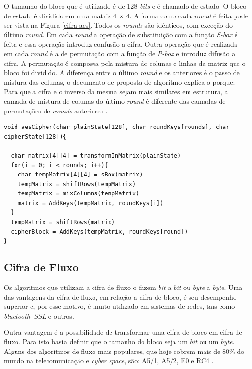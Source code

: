 O tamanho do bloco que é utilizado é de 128 \textit{bits} e é chamado de estado. O bloco de estado é dividido em uma matriz 4 $\times$ 4. A forma como cada \textit{round} é feita pode ser vista na Figura \ref{cifra-aes}. Todos os \textit{rounds} são idênticos, com exceção do último \textit{round}. Em cada \textit{round} a operação de substituição com a função \textit{S-box} é feita e essa operação introduz confusão a cifra. Outra operação que é realizada em cada \textit{round} é a de permutação com a função de \textit{P-box} e introduz difusão a cifra. A permutação é composta pela mistura de colunas e linhas da matriz que o bloco foi dividido. A diferença entre o último \textit{round} e os anteriores é o passo de mistura das colunas, o documento de proposta de algoritmo explica o porque: Para que a cifra e o inverso da mesma sejam mais similares em estrutura, a camada de mistura de colunas do último \textit{round} é diferente das camadas de permutações de \textit{rounds} anteriores \cite{aes-proposal}.

    \begin{lstlisting}[caption={Pseudo-código AES}, label=aes-pseudo-code]
void aesCipher(char plainState[128], char roundKeys[rounds], char cipherState[128]){

  char matrix[4][4] = transformInMatrix(plainState)
  for(i = 0; i < rounds; i++){
	char tempMatrix[4][4] = sBox(matrix)   
	tempMatrix = shiftRows(tempMatrix) 
	tempMatrix = mixColumns(tempMatrix)
	matrix = AddKeys(tempMatrix, roundKeys[i])
  }
  tempMatrix = shiftRows(matrix)
  cipherBlock = AddKeys(tempMatrix, roundKeys[round])
}
    \end{lstlisting}

\subsection{Cifra de Fluxo}
\label{stream-cipher}

Os algoritmos que utilizam a cifra de fluxo o fazem \textit{bit} a \textit{bit} ou \textit{byte} a \textit{byte}. Uma das vantagens da cifra de fluxo, em relação a cifra de bloco, é seu desempenho superior e, por esse motivo, é muito utilizado em sistemas de redes, tais como \textit{bluetooth}, \textit{SSL} e outros. 

Outra vantagem é a possibilidade de transformar uma cifra de bloco em cifra de fluxo. Para isto basta definir que o tamanho do bloco seja um \textit{bit} ou um \textit{byte}. Alguns dos algoritmos de fluxo mais populares, que hoje cobrem mais de 80\% do mundo na telecomunicação e \textit{cyber space}, são: A5/1, A5/2, E0 e RC4 \cite{majid-mohd}.

